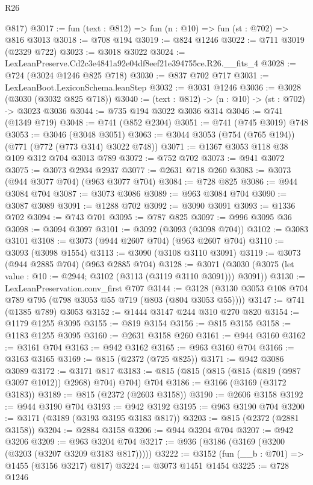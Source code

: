 \begin{lexlean}{R26}
\begin{coremodule}
      @817)
@3017 := fun (text : @812) => fun (n : @10) => fun (st : @702) => @816 @3013
@3018 := @708 @194
@3019 := @824 @1246
@3022 := @711 @3019 (@2329 @722)
@3023 := @3018 @3022
@3024 := LexLeanPreserve.Cd2c3e4841a92e04df8eef21e394755ce.R26.__fits_4
@3028 := @724 (@3024 @1246 @825 @718)
@3030 := @837 @702 @717
@3031 := LexLeanBoot.LexiconSchema.leanStep
@3032 := @3031 @1246
@3036 := @3028 (@3030 (@3032 @825 @718))
@3040 := (text : @812) -> (n : @10) -> (st : @702) -> @3023 @3036
@3044 := @735 @194 @3022 @3036 @314
@3046 := @741 (@1349 @719)
@3048 := @741 (@852 @2304)
@3051 := @741 (@745 @3019) @748
@3053 := @3046 (@3048 @3051)
@3063 := @3044 @3053 (@754 (@765 @194)) (@771 (@772 (@773 @314) @3022 @748))
@3071 := @1367 @3053 @118 @38 @109 @312 @704 @3013 @789
@3072 := @752 @702
@3073 := @941 @3072
@3075 := @3073 @2934 @2937
@3077 := @2631 @718 @260
@3083 := @3073 (@944 @3077 @704) (@963 @3077 @704)
@3084 := @728 @825
@3086 := @944 @3084 @704
@3087 := @3073 @3086
@3089 := @963 @3084 @704
@3090 := @3087 @3089
@3091 := @1288 @702
@3092 := @3090 @3091
@3093 := @1336 @702
@3094 := @743 @701
@3095 := @787 @825
@3097 := @996 @3095 @36
@3098 := @3094 @3097
@3101 := @3092 (@3093 (@3098 @704))
@3102 := @3083 @3101
@3108 := @3073 (@944 @2607 @704) (@963 @2607 @704)
@3110 := @3093 (@3098 @1554)
@3113 := @3090 (@3108 @3110 @3091)
@3119 := @3073 (@944 @2885 @704) (@963 @2885 @704)
@3128 := @3071 (@3030 (@3075 (let value : @10 := @2944; @3102 (@3113 (@3119 @3110 @3091))) @3091))
@3130 := LexLeanPreservation.conv_first @707
@3144 := @3128 (@3130 @3053 @108 @704 @789 @795 (@798 @3053 @55 @719 (@803 (@804 @3053 @55))))
@3147 := @741 (@1385 @789) @3053
@3152 := @1444 @3147 @244 @310 @270 @820
@3154 := @1179 @1255 @3095
@3155 := @819 @3154
@3156 := @815 @3155
@3158 := @1183 @1255 @3095
@3160 := @2631 @3158 @260
@3161 := @944 @3160
@3162 := @3161 @704
@3163 := @942 @3162
@3165 := @963 @3160 @704
@3166 := @3163 @3165
@3169 := @815 (@2372 (@725 @825))
@3171 := @942 @3086 @3089
@3172 := @3171 @817
@3183 := @815 (@815 (@815 (@815 (@819 (@987 @3097 @1012)) @2968) @704) @704) @704
@3186 := @3166 (@3169 (@3172 @3183))
@3189 := @815 (@2372 (@2603 @3158))
@3190 := @2606 @3158
@3192 := @944 @3190 @704
@3193 := @942 @3192
@3195 := @963 @3190 @704
@3200 := @3171 (@3189 (@3193 @3195 @3183 @817))
@3203 := @815 (@2372 (@2881 @3158))
@3204 := @2884 @3158
@3206 := @944 @3204 @704
@3207 := @942 @3206
@3209 := @963 @3204 @704
@3217 := @936 (@3186 (@3169 (@3200 (@3203 (@3207 @3209 @3183 @817)))))
@3222 := @3152 (fun (__b : @701) => @1455 (@3156 @3217) @817)
@3224 := @3073 @1451 @1454
@3225 := @728 @1246

\end{coremodule}
\end{lexlean}
